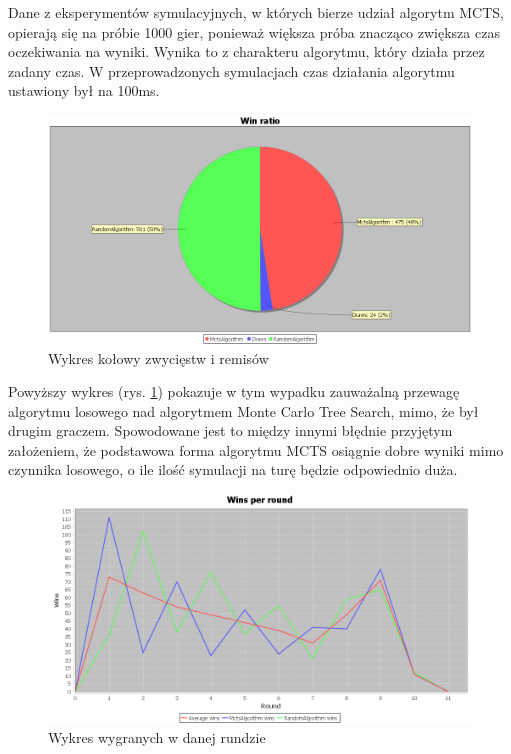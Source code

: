 Dane z eksperymentów symulacyjnych, w których bierze udział algorytm MCTS, opierają się na próbie 1000 gier, ponieważ większa próba znacząco zwiększa czas oczekiwania na wyniki. Wynika to z charakteru algorytmu, który działa przez zadany czas. W przeprowadzonych symulacjach czas działania algorytmu ustawiony był na 100ms.

\begin{figure}[H]
	\centering
	\includegraphics[width=\textwidth]{Resources/MctsVsR/MctsVsRwin.PNG}
	\caption{Wykres kołowy zwycięstw i remisów} 
	\label{fig:MctsVsRwin}
\end{figure}

Powyższy wykres (rys. \ref{fig:MctsVsRwin}) pokazuje w tym wypadku zauważalną przewagę algorytmu losowego nad algorytmem Monte Carlo Tree Search, mimo, że był drugim graczem. Spowodowane jest to między innymi błędnie przyjętym założeniem, że podstawowa forma algorytmu MCTS osiągnie dobre wyniki mimo czynnika losowego, o ile ilość symulacji na turę będzie odpowiednio duża.

\begin{figure}[H]
	\centering
	\includegraphics[width=\textwidth]{Resources/MctsVsR/MctsVsRroundwin.PNG}
	\caption{Wykres wygranych w danej rundzie} 
	\label{fig:MctsVsRroundwin}
\end{figure}

